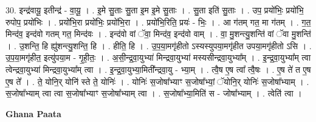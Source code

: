 \documentclass[17pt]{extarticle}
\begin{document}
30. इन्द्र॑वायू॒ इतीन्द्र॑ - वा॒यू॒ । . इ॒मे सु॒ताः सु॒ता इ॒म इ॒मे सु॒ताः । . सु॒ता इति॑ सु॒ताः । . उप॒ प्रयो॑भिः॒ प्रयो॑भि॒ रुपोप॒ प्रयो॑भिः । . प्रयो॑भि॒रा प्रयो॑भिः॒ प्रयो॑भि॒रा । . प्रयो॑भि॒रिति॒ प्रयः॑ - भिः॒ । . आ ग॑तम् गत॒ मा ग॑तम् । . ग॒त॒ मिन्द॑व॒ इन्द॑वो गतम् गत॒ मिन्द॑वः । . इन्द॑वो वां ॅवा॒ मिन्द॑व॒ इन्द॑वो वाम् । . वा॒ मु॒शन्त्यु॒शन्ति॑ वां ॅवा मु॒शन्ति॑ । . उ॒शन्ति॒ हि ह्यु॑शन्त्यु॒शन्ति॒ हि । . हीति॒ हि । . उ॒प॒या॒मगृ॑हीतो ऽस्यस्युपया॒मगृ॑हीत उपया॒मगृ॑हीतो ऽसि । . उ॒प॒या॒मगृ॑हीत॒ इत्यु॑पया॒म - गृ॒ही॒तः॒ । . अ॒सी॒न्द्र॒वा॒युभ्या॑ मिन्द्रवा॒युभ्या॑ मस्यसीन्द्रवा॒युभ्या᳚म् । . इ॒न्द्र॒वा॒युभ्या᳚म् त्वा त्वेन्द्रवा॒युभ्या॑ मिन्द्रवा॒युभ्या᳚म् त्वा । . इ॒न्द्र॒वा॒युभ्या॒मिती᳚न्द्रवा॒यु - भ्या॒म् । . त्वै॒ष ए॒ष त्वा᳚ त्वै॒षः । . ए॒ष ते॑ त ए॒ष ए॒ष ते᳚ । . ते॒ योनि॒र् योनि॑ स्ते ते॒ योनिः॑ । . योनिः॑ स॒जोषा᳚भ्याꣳ स॒जोषा᳚भ्यां॒ ॅयोनि॒र् योनिः॑ स॒जोषा᳚भ्याम् । . स॒जोषा᳚भ्याम् त्वा त्वा स॒जोषा᳚भ्याꣳ स॒जोषा᳚भ्याम् त्वा । . स॒जोषा᳚भ्या॒मिति॑ स - जोषा᳚भ्याम् । . त्वेति॑ त्वा । \newline

\textbf{Ghana Paata } \newline
\end{document}
